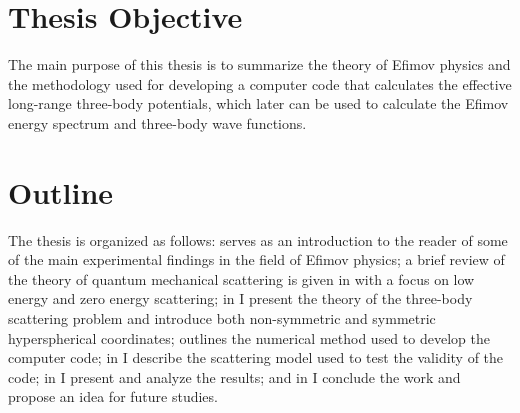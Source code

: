 \section{Thesis Objective}
The main purpose of this thesis is to summarize the theory of Efimov physics and the methodology used for developing a computer code that calculates the effective long-range three-body potentials, which later can be used to calculate the Efimov energy spectrum and three-body wave functions. 

\section{Outline}
The thesis is organized as follows:  serves as an introduction to the reader of some of the main experimental findings in the field of Efimov physics; a brief review of the theory of quantum mechanical scattering is given in  with a focus on low energy and zero energy scattering; in  I present the theory of the three-body scattering problem and introduce both non-symmetric and symmetric hyperspherical coordinates;  outlines the numerical method used to develop the computer code; in  I describe the scattering model used to test the validity of the code; in  I present and analyze the results; and in  I conclude the work and propose an idea for future studies.
